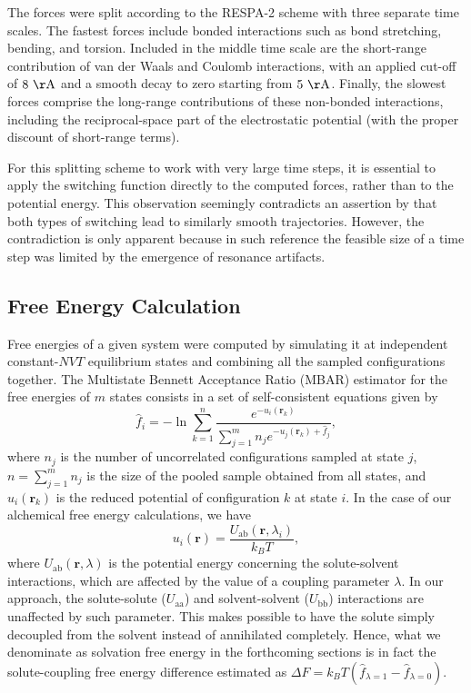 \documentclass[
aip,
jcp,
reprint,
]{revtex4-1}
\newcommand{\vt}[1]{\boldsymbol{\mathbf{#1}}}          %
\begin{document}
The forces were split according to the RESPA-2 scheme \cite{Zhou_2001, Morrone_2010, Leimkuhler_2013} with three separate time scales.
The fastest forces include bonded interactions such as bond stretching, bending, and torsion.
Included in the middle time scale are the short-range contribution of van der Waals and Coulomb interactions, with an applied cut-off of $8~\mathrm{\AA}$ and a smooth decay to zero starting from $5~\mathrm{\AA}$.
Finally, the slowest forces comprise the long-range contributions of these non-bonded interactions, including the reciprocal-space part of the electrostatic potential (with the proper discount of short-range terms).

For this splitting scheme to work with very large time steps, it is essential to apply the switching function directly to the computed forces, rather than to the potential energy.
This observation seemingly contradicts an assertion by \citeauthor{Morrone_2010} \cite{Morrone_2010} that both types of switching lead to similarly smooth trajectories.
However, the contradiction is only apparent because in such reference the feasible size of a time step was limited by the emergence of resonance artifacts.

\subsection{Free Energy Calculation}
\label{sec:free energy calculation}

Free energies of a given system were computed by simulating it at independent constant-$NVT$ equilibrium states and combining all the sampled configurations together.
The Multistate Bennett Acceptance Ratio (MBAR) estimator \cite{Kong_2003, Shirts_2008} for the free energies of $m$ states consists in a set of self-consistent equations given by
\begin{equation}
\label{eq:mbar free energy estimator}
\hat f_i = -\ln \sum_{k=1}^n \frac{e^{-u_i(\vt r_k)}}{\sum_{j=1}^m n_j e^{-u_j(\vt r_k) + \hat f_j}},
\end{equation}
where $n_j$ is the number of uncorrelated configurations sampled at state $j$, $n = \sum_{j=1}^m n_j$ is the size of the pooled sample obtained from all states, and $u_i(\vt r_k)$ is the reduced potential of configuration $k$ at state $i$.
In the case of our alchemical free energy calculations, we have
\begin{equation}
u_i(\vt r) = \frac{U_\mathrm{ab}(\vt r, \lambda_i)}{k_B T},
\end{equation}
where $U_\mathrm{ab}(\vt r, \lambda)$ is the potential energy concerning the solute-solvent interactions, which are affected by the value of a coupling parameter $\lambda$.
In our approach, the solute-solute ($U_\mathrm{aa}$) and solvent-solvent ($U_\mathrm{bb}$) interactions are unaffected by such parameter.
This makes possible to have the solute simply decoupled from the solvent instead of annihilated completely.
Hence, what we denominate as solvation free energy in the forthcoming sections is in fact the solute-coupling free energy difference estimated as $\Delta F = k_B T ({\hat f}_{\lambda=1} - {\hat f}_{\lambda=0})$.
\end{document}
